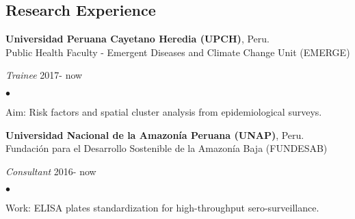 \documentclass[margin,line]{res}
\newenvironment{list1}{
  \begin{list}{\ding{113}}{%
      \setlength{\itemsep}{0in}
      \setlength{\parsep}{0in} \setlength{\parskip}{0in}
      \setlength{\topsep}{0in} \setlength{\partopsep}{0in}
      \setlength{\leftmargin}{0.17in}}}{\end{list}}
\newenvironment{list2}{
  \begin{list}{$\bullet$}{%
      \setlength{\itemsep}{0in}
      \setlength{\parsep}{0in} \setlength{\parskip}{0in}
      \setlength{\topsep}{0in} \setlength{\partopsep}{0in}
      \setlength{\leftmargin}{0.2in}}}{\end{list}}
\begin{document}
\begin{resume}
\section{\sc Research Experience}

{\bf Universidad Peruana Cayetano Heredia (UPCH)}, Peru.\\
Public Health Faculty - Emergent Diseases and Climate Change Unit (EMERGE)\\
\vspace*{-.1in}
\begin{list1}
	\item[] {\em Trainee} \hfill 2017- now\\%
	\vspace*{-.1in}
	\begin{list2} %
		\item Aim: Risk factors and spatial cluster analysis from epidemiological surveys.\\%
	\end{list2}
\end{list1}

{\bf Universidad Nacional de la Amazon\'ia Peruana (UNAP)}, Peru.\\
Fundaci\'on para el Desarrollo Sostenible de la Amazon\'ia Baja (FUNDESAB)\\
\vspace*{-.1in}
\begin{list1}
	\item[] {\em Consultant} \hfill 2016- now\\%
	\vspace*{-.1in}
	\begin{list2} %
		\item Work: ELISA plates standardization for high-throughput sero-surveillance.\\%
	\end{list2}
\end{list1}


\end{resume}
\end{document}
